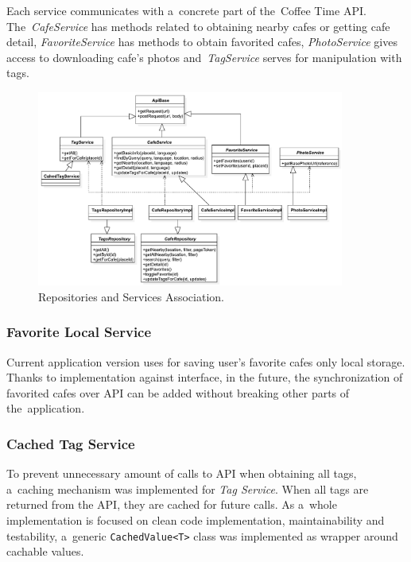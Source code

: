 Each service communicates with a~concrete part of the~Coffee Time API. The~\textit{CafeService} has methods related to obtaining nearby cafes or getting cafe detail, \textit{FavoriteService} has methods to obtain favorited cafes, \textit{PhotoService} gives access to downloading cafe's photos and~\textit{TagService} serves for manipulation with tags.


\begin{figure}
    \centering
    \includegraphics[width=0.9\textwidth]{img/implementation/repo-services.pdf}
    \caption{Repositories and Services Association.}
    \label{fig:ct-repo-services}
\end{figure}

\clearpage

\subsubsection{Favorite Local Service}
Current application version uses for saving user's favorite cafes only local storage. Thanks to implementation against interface, in the future, the synchronization of favorited cafes over API can be added without breaking other parts of the~application. 

\subsubsection{Cached Tag Service}
To prevent unnecessary amount of calls to API when obtaining all tags, a~caching mechanism was implemented for \textit{Tag Service}. When all tags are returned from the API, they are cached for future calls. As a~whole implementation is focused on clean code implementation, maintainability and testability, a~generic \verb|CachedValue<T>| class was implemented as wrapper around cachable values. 

